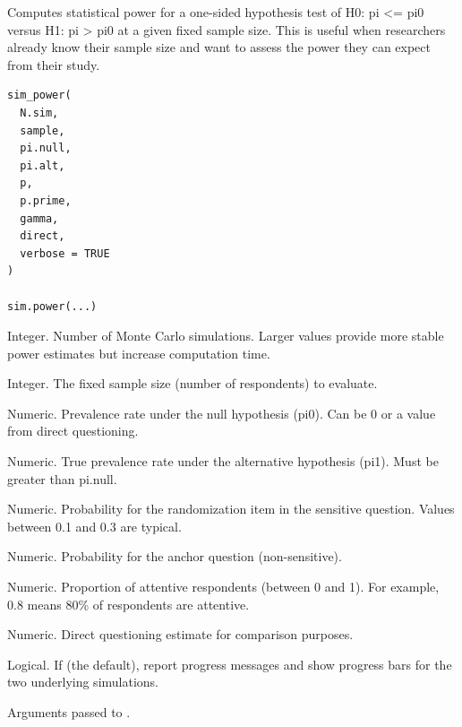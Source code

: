 \documentclass[a4paper]{book}
\begin{document}
%
\begin{Description}
Computes statistical power for a one-sided hypothesis test of
H0: pi <= pi0 versus H1: pi > pi0 at a given fixed sample size. This is useful
when researchers already know their sample size and want to assess the
power they can expect from their study.
\end{Description}
%
\begin{Usage}
\begin{verbatim}
sim_power(
  N.sim,
  sample,
  pi.null,
  pi.alt,
  p,
  p.prime,
  gamma,
  direct,
  verbose = TRUE
)

sim.power(...)
\end{verbatim}
\end{Usage}
%
\begin{Arguments}
\begin{ldescription}
\item[\code{N.sim}] Integer. Number of Monte Carlo simulations.
Larger values provide more stable power estimates but increase computation time.

\item[\code{sample}] Integer. The fixed sample size (number of respondents) to evaluate.

\item[\code{pi.null}] Numeric. Prevalence rate under the null hypothesis (pi0).
Can be 0 or a value from direct questioning.

\item[\code{pi.alt}] Numeric. True prevalence rate under the alternative hypothesis (pi1).
Must be greater than pi.null.

\item[\code{p}] Numeric. Probability for the randomization item in the sensitive question.
Values between 0.1 and 0.3 are typical.

\item[\code{p.prime}] Numeric. Probability for the anchor question (non-sensitive).

\item[\code{gamma}] Numeric. Proportion of attentive respondents (between 0 and 1).
For example, 0.8 means 80\% of respondents are attentive.

\item[\code{direct}] Numeric. Direct questioning estimate for comparison purposes.

\item[\code{verbose}] Logical. If  (the default), report progress messages
and show progress bars for the two underlying simulations.

\item[\code{...}] Arguments passed to .
\end{ldescription}
\end{Arguments}
\end{document}
